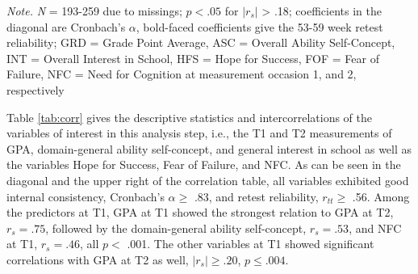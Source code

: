 \documentclass[
  man]{apa6}
\begin{document}
\begin{table}[tbp]
\begin{center}
\begin{threeparttable}
{}

\begin{tablenotes}[para]
\normalsize{\textit{Note.} \textit{N} = 193-259 due to missings; $p < .05$ for $|r_{s}|$ > .18; coefficients in the diagonal are Cronbach’s $\alpha$, bold-faced coefficients give the 53-59 week retest reliability; GRD = Grade Point Average, ASC = Overall Ability Self-Concept, INT = Overall Interest in School, HFS = Hope for Success, FOF = Fear of Failure, NFC = Need for Cognition at measurement occasion 1, and 2, respectively}
\end{tablenotes}

\end{threeparttable}
\end{center}

\end{table}

Table \ref{tab:corr} gives the descriptive statistics and intercorrelations of the variables of interest in this analysis step, i.e., the T1 and T2 measurements of GPA, domain-general ability self-concept, and general interest in school as well as the variables Hope for Success, Fear of Failure, and NFC. As can be seen in the diagonal and the upper right of the correlation table, all variables exhibited good internal consistency, Cronbach's \(\alpha\ge\) .83, and retest reliability, \(r_{tt}\ge\) .56. Among the predictors at T1, GPA at T1 showed the strongest relation to GPA at T2, \(r_{s}=.75\), followed by the domain-general ability self-concept, \(r_{s}=.53\), and NFC at T1, \(r_{s}=.46\), all \(p<\) .001. The other variables at T1 showed significant correlations with GPA at T2 as well, \(|r_{s}|\ge.20\), \(p\le.004\).
\end{document}
